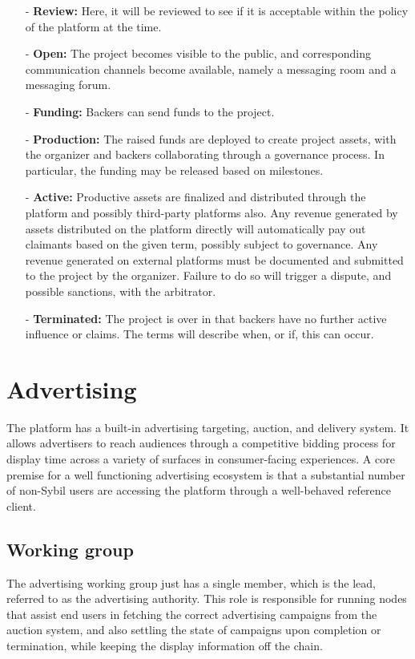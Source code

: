 \documentclass{article}
\begin{document}
\begin{itemize}
    \item[-] \textbf{Review:} Here, it will be reviewed to see if it is acceptable within the policy of the platform at the time.
    \item[-] \textbf{Open:} The project becomes visible to the public, and corresponding communication channels become available, namely a messaging room and a messaging forum.
    \item[-] \textbf{Funding:} Backers can send funds to the project.
    \item[-] \textbf{Production:} The raised funds are deployed to create project assets, with the organizer and backers collaborating through a governance process. In particular, the funding may be released based on milestones.
    \item[-] \textbf{Active:} Productive assets are finalized and distributed through the platform and possibly third-party platforms also. Any revenue generated by assets distributed on the platform directly will automatically pay out claimants based on the given term, possibly subject to governance. Any revenue generated on external platforms must be documented and submitted to the project by the organizer. Failure to do so will trigger a dispute, and possible sanctions, with the arbitrator.
    \item[-] \textbf{Terminated:} The project is over in that backers have no further active influence or claims. The terms will describe when, or if, this can occur.
\end{itemize}

\section{Advertising} \label{sec:advertising}

The platform has a built-in advertising targeting, auction, and delivery system. It allows advertisers to reach audiences through a competitive bidding process for display time across a variety of surfaces in consumer-facing experiences. A core premise for a well functioning advertising ecosystem is that a substantial number of non-Sybil users are accessing the platform through a well-behaved reference client.

\subsection{Working group}

The advertising working group just has a single member, which is the lead, referred to as the advertising authority. This role is responsible for running nodes that assist end users in fetching the correct advertising campaigns from the auction system, and also settling the state of campaigns upon completion or termination, while keeping the display information off the chain.
\end{document}
